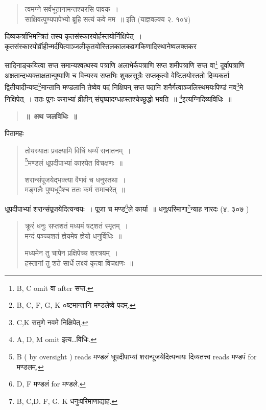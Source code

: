 \documentclass[11pt, openany]{book}
\begin{document}
\begin{quote}
{\vy त्वमग्ने सर्वभूतानामन्तश्चरसि पावक~।\\
साक्षिवत्पुण्यपापेभ्यो ब्रूहि सत्यं कवे मम~॥} इति (याज्ञवल्क्य २. १०४)
\end{quote}

\begin{sloppypar}
दिव्यकर्त्राभिमन्त्रितं तस्य कृतसंस्कारयोर्हस्तयोर्निक्षिपेत्~। कृतसंस्कारयोर्व्रीहीन्मर्दयित्वाञ्जलीकृतयोस्तिलकालकव्रणकिणादिस्थानेष्वलक्तकर\textendash
\end{sloppypar}

\newpage

\noindent
सादिनाङ्कयित्वा सप्त समान्यश्वत्थस्य पत्राणि अलाभेर्कपत्राणि सप्त शमीपत्राणि सप्त वा\renewcommand{\thefootnote}{1}\footnote{B, C omit वा after सप्त.} दूर्वापत्राणि अक्षतान्दध्यक्ताक्षतान्पुष्पाणि च विन्यस्य सप्तभिः शुक्लसूत्रैः सप्तकृत्वो वेष्टितयोस्ततो दिव्यकर्ता द्वितीयादीन्यष्ट\renewcommand{\thefootnote}{2}\footnote{B, C, F, G, K ०ष्टमान्तानि मण्डलेष्वे पदम्.}मान्तानि मण्डलानि तेष्वेव पदं निक्षिपन् सप्त पदानि शनैर्गत्वाञ्जलिस्थमयःपिण्डं नव\renewcommand{\thefootnote}{3}\footnote{C,K सतृणे नवमे निक्षिपेत्.}मे निक्षिपेत्~। ततः पुनः कराभ्यां व्रीहीन् संघृष्यादग्धहस्तश्चेच्छुद्धो भवति~॥ \renewcommand{\thefootnote}{4}\footnote{A, D, M omit इत्य\ldots विधिः.}इत्यग्निदिव्यविधिः~॥

\begin{quote}
\textbf{\Large ॥~अथ जलविधिः~॥}
\end{quote}

पितामहः

\begin{quote}
{\vy तोयस्यातः प्रवक्ष्यामि विधिं धर्म्यं सनातनम्~।\\
\renewcommand{\thefootnote}{5}\footnote{B ( by oversight ) reads मण्डलं धूपदीपाभ्यां शरान्पूजयेदित्यन्वयः दिव्यतत्त्व reads मण्डपं for मण्डलम्.}मण्डलं धूपदीपाभ्यां कारयेत विचक्षणः~॥

शरान्संपूजयेद्भक्त्या वैणवं च धनुस्तथा~।\\
मङ्गलैः पुष्पधूपैश्च ततः कर्म समाचरेत्~॥}
\end{quote}

धूपदीपाभ्यां शरान्संपूजयेदित्यन्वयः~। पूजा च मण्ड\renewcommand{\thefootnote}{6}\footnote{D, F मण्डलं for मण्डले.}ले कार्या~॥ धनुःपरिमाणा\renewcommand{\thefootnote}{7}\footnote{B, C,D. F, G. K धनुःपरिमाणाद्याह.}न्याह नारदः (४. ३०७ ) 

\begin{quote}
{\vy क्रूरं धनुः सप्तशतं मध्यमं षट्शतं स्मृतम्~।\\
मन्दं पञ्च्चशतं ज्ञेयमेष ज्ञेयो धनुर्विधिः~॥

मध्यमेन तु चापेन प्रक्षिपेच्च शरत्रयम्~।\\
हस्तानां तु शते सार्धे लक्ष्यं कृत्वा विचक्षणः~॥}
\end{quote}
\end{document}

